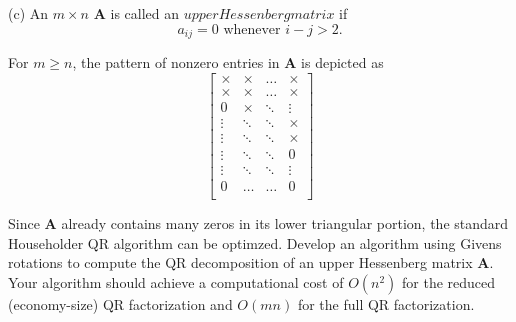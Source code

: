 \documentclass{article}
\begin{document}
(c) An \(m \times n\) \(\bm{A}\) is called an \(upper Hessenberg matrix\) if
\[
    a_{ij} = 0 \text{ whenever } i - j > 2.
\]

For \(m \geq n\), the pattern of nonzero entries in \(\bm{A}\) is depicted as
\[
\begin{bmatrix}
    \times & \times & \dots & \times \\
    \times & \times & \dots & \times \\
    0 & \times & \ddots & \vdots \\
    \vdots & \ddots & \ddots & \times \\
    \vdots & \ddots & \ddots & \times \\
    \vdots & \ddots & \ddots & 0 \\
    \vdots & \ddots & \ddots & \vdots \\
    0 & \dots & \dots & 0 \\
\end{bmatrix}
\]

Since \(\bm{A}\) already contains many zeros in its lower triangular portion, the standard Householder QR algorithm can be optimzed.
Develop an algorithm using Givens rotations to compute the QR decomposition of an upper Hessenberg matrix \(\bm{A}\). Your algorithm should achieve a computational cost of \(O(n^2)\) for the reduced (economy-size) QR factorization and \(O(mn)\) for the full QR factorization.
\end{document}
